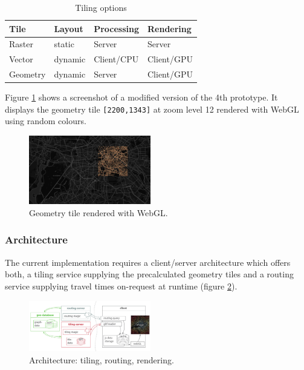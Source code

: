 \documentclass{motivation}
\begin{document}
  \begin{table}[!h]
    \centering
    \begin{tabular}{l|l|l|l}
      Tile & Layout & Processing & Rendering\\ \hline
      \cellcolor{yellow!15}Raster & \cellcolor{red!15}static & \cellcolor{green!15}Server & \cellcolor{red!15}Server\\
      \cellcolor{yellow!15}Vector & \cellcolor{green!15}dynamic & \cellcolor{red!15}Client/CPU & \cellcolor{green!15}Client/GPU\\
      \cellcolor{green!15}Geometry & \cellcolor{green!15}dynamic & \cellcolor{green!15}Server & \cellcolor{green!15}Client/GPU\\
    \end{tabular}
    \caption{Tiling options}
    \label{tab:tilopts}
  \end{table}
  Figure \ref{fig:geotile} shows a screenshot of a modified version of the 4th prototype. It displays the geometry tile \texttt{[2200,1343]} at zoom level 12 rendered with WebGL using random colours.

  \begin{figure}[h]
    \centering
    \includegraphics[width=0.475\textwidth]{../img/geometry-tile.png}
    \caption{Geometry tile rendered with WebGL.}
    \label{fig:geotile}
  \end{figure}

\subsubsection{Architecture}
  The current implementation requires a client/server architecture which offers both, a tiling service supplying the precalculated geometry tiles and a routing service supplying travel times on-request at runtime (figure \ref{fig:arch}).

  \begin{figure}[h]
    \centering
    \includegraphics[width=0.475\textwidth]{../pdf/arch.pdf}
    \caption{Architecture: tiling, routing, rendering.}
    \label{fig:arch}
  \end{figure}
\end{document}
